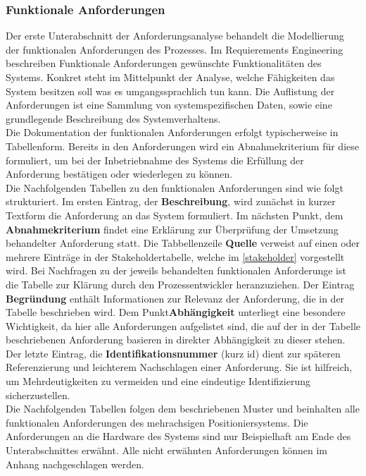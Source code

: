\documentclass[../Bachelorarbeit.tex]{subfiles}
\begin{document}
\subsubsection{Funktionale Anforderungen}
Der erste Unterabschnitt der Anforderungsanalyse behandelt die Modellierung der funktionalen Anforderungen des Prozesses. Im Requierements Engineering beschreiben Funktionale Anforderungen gewünschte Funktionalitäten des Systems. Konkret steht im Mittelpunkt der Analyse, welche Fähigkeiten das System besitzen soll \bzw was es umgangssprachlich tun kann. Die Auflistung der Anforderungen ist eine Sammlung von systemspezifischen Daten, sowie eine grundlegende Beschreibung des Systemverhaltens. \\ %
Die Dokumentation der funktionalen Anforderungen erfolgt typischerweise in Tabellenform. Bereits in den Anforderungen wird ein Abnahmekriterium für diese formuliert, um bei der Inbetriebnahme des Systems die Erfüllung der Anforderung bestätigen oder wiederlegen zu können.\\ %
Die Nachfolgenden Tabellen zu den funktionalen Anforderungen sind wie folgt strukturiert. Im ersten Eintrag, der \textbf{Beschreibung}, wird zunächst in kurzer Textform die Anforderung an das System formuliert. Im nächsten Punkt, dem \textbf{Abnahmekriterium} findet eine Erklärung zur Überprüfung der Umsetzung behandelter Anforderung statt. Die Tabbellenzeile \textbf{Quelle} verweist auf einen oder mehrere Einträge in der Stakeholdertabelle, welche im \autoref{stakeholder} vorgestellt wird. Bei Nachfragen zu der jeweils behandelten funktionalen Anforderunge ist die Tabelle zur Klärung durch den Prozessentwickler heranzuziehen. Der Eintrag \textbf{Begründung} enthält Informationen zur Relevanz der Anforderung, die in der Tabelle beschrieben wird. Dem Punkt\textbf{Abhängigkeit} unterliegt eine besondere Wichtigkeit, da hier alle Anforderungen aufgelistet sind, die auf der in der Tabelle beschriebenen Anforderung basieren \bzw in direkter Abhängigkeit zu dieser stehen. Der letzte Eintrag, die \textbf{Identifikationsnummer} (kurz \acs{id}) dient zur späteren Referenzierung und leichterem Nachschlagen einer Anforderung. Sie ist hilfreich, um Mehrdeutigkeiten zu vermeiden und eine eindeutige Identifizierung sicherzustellen.\\ %
Die Nachfolgenden Tabellen folgen dem beschriebenen Muster und beinhalten alle funktionalen Anforderungen des mehrachsigen Positioniersystems. Die Anforderungen an die Hardware des Systems sind nur Beispielhaft am Ende des Unterabschnittes erwähnt. Alle nicht erwähnten Anforderungen können im Anhang nachgeschlagen werden.
\end{document}
